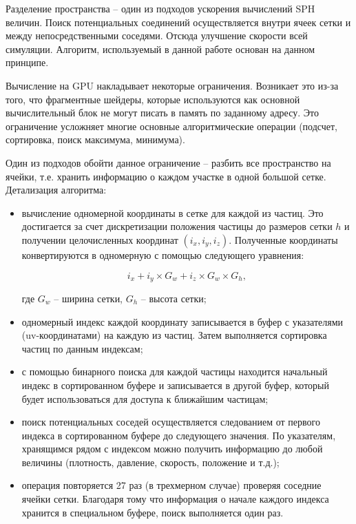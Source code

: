 Разделение пространства -- один из подходов ускорения вычислений SPH величин.
Поиск потенциальных соединений осуществляется внутри ячеек сетки и между непосредственными 
соседями. Отсюда улучшение скорости всей симуляции. Алгоритм, используемый в данной работе
основан на данном принципе. 

Вычисление на GPU накладывает некоторые ограничения. Возникает это из-за того, что 
фрагментные шейдеры, которые используются как основной вычислительный блок не могут
писать в память по заданному адресу. Это ограничение усложняет многие основные
алгоритмические операции (подсчет, сортировка, поиск максимума, минимума).  

Один из подходов обойти данное ограничение -- разбить все пространство на ячейки, т.е.
хранить информацию о каждом участке в одной большой сетке.  \\

Детализация алгоритма:

\begin{itemize}
  \item вычисление одномерной координаты в сетке для каждой из частиц. Это достигается за счет
    дискретизации положения частицы до размеров сетки $h$ и получении целочисленных координат
    $(i_x, i_y, i_z)$. Полученные координаты конвертируются в одномерную с помощью следующего
    уравнения:

    \begin{equation}
    \label{eq:}
      i_x + i_y \times G_w + i_z \times G_w \times G_h,
    \end{equation}

    где $G_w$ -- ширина сетки, $G_h$ -- высота сетки;

  \item одномерный индекс каждой координату записывается в буфер с указателями (uv-координатами)
    на каждую из частиц. Затем выполняется сортировка частиц по данным индексам;

  \item с помощью бинарного поиска для каждой частицы находится начальный индекс в сортированном
    буфере и записывается в другой буфер, который будет использоваться для доступа к ближайшим
    частицам;

  \item поиск потенциальных соседей осуществляется следованием от первого индекса в сортированном
    буфере до следующего значения. По указателям, хранящимся рядом с индексом можно получить 
    информацию до любой величины (плотность, давление, скорость, положение и т.д.);

  \item операция повторяется 27 раз (в трехмерном случае) проверяя соседние ячейки сетки.
    Благодаря тому что информация о начале каждого индекса хранится в специальном буфере,
    поиск выполняется один раз.

\end{itemize}

